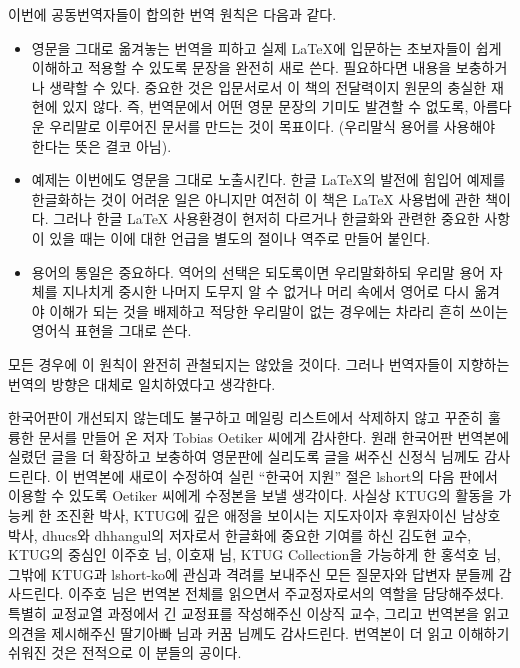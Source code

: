 이번에 공동번역자들이 합의한 번역 원칙은 다음과 같다.
\begin{itemize}
\item 영문을 그대로 옮겨놓는 번역을 피하고 실제 \LaTeX 에 입문하는 초보자들이 쉽게 이해하고 적용할 수 있도록
    문장을 완전히 새로 쓴다. 필요하다면 내용을 보충하거나 생략할 수 있다. 중요한 것은 입문서로서 이 책의
    전달력이지 원문의 충실한 재현에 있지 않다. 즉, 번역문에서 어떤 영문 문장의 기미도 발견할 수 없도록,
    아름다운 우리말로 이루어진 문서를 만드는 것이 목표이다. (우리말식 용어를 사용해야 한다는 뜻은 결코
    아님).

\item 예제는 이번에도 영문을 그대로 노출시킨다. 한글 \LaTeX 의 발전에 힘입어 예제를 한글화하는 것이 어려운
    일은 아니지만 여전히 이 책은 \LaTeX{} 사용법에 관한 책이다.
    그러나 한글 \LaTeX{} 사용환경이 현저히 다르거나 한글화와 관련한 중요한 사항이 있을 때는
    이에 대한 언급을 별도의 절이나 역주로 만들어 붙인다.

\item 용어의 통일은 중요하다. 역어의 선택은 되도록이면 우리말화하되 우리말 용어 자체를 지나치게 중시한 나머지
    도무지 알 수 없거나 머리 속에서 영어로 다시 옮겨야 이해가 되는 것을 배제하고 적당한 우리말이 없는
    경우에는 차라리 흔히 쓰이는 영어식 표현을 그대로 쓴다.
    
\end{itemize}

모든 경우에 이 원칙이 완전히 관철되지는 않았을 것이다. 그러나 번역자들이 지향하는
번역의 방향은 대체로 일치하였다고 생각한다. 

한국어판이 개선되지 않는데도 불구하고 메일링 리스트에서 삭제하지 않고
꾸준히 훌륭한 문서를 만들어 온 저자 Tobias Oetiker 씨에게 감사한다. 
원래 한국어판 번역본에 실렸던 글을 더 확장하고 보충하여 영문판에 실리도록
글을 써주신 신정식 님께도 감사드린다. 이 번역본에 새로이 수정하여 실린
``한국어 지원'' 절은 lshort의 다음 판에서 이용할 수 있도록 Oetiker 씨에게
수정본을 보낼 생각이다.
사실상 KTUG의 활동을 가능케 한 조진환 박사, KTUG에 깊은 애정을 보이시는
지도자이자 후원자이신 남상호 박사, dhucs와 dhhangul의 저자로서 한글화에
중요한 기여를 하신 김도현 교수, KTUG의 중심인 이주호 님, 이호재 님,
KTUG Collection을 가능하게 한 홍석호 님, 그밖에 KTUG과 lshort-ko에
관심과 격려를 보내주신 모든 질문자와 답변자 분들께 감사드린다. 이주호 님은
번역본 전체를 읽으면서 주교정자로서의 역할을 담당해주셨다.
특별히 교정\cntrdot 교열 과정에서 긴 교정표를 작성해주신 이상직 교수, 그리고 
번역본을 읽고 의견을 제시해주신 딸기아빠 님과 커꿈 님께도 감사드린다.
번역본이 더 읽고 이해하기 쉬워진 것은 전적으로 이 분들의 공이다.

